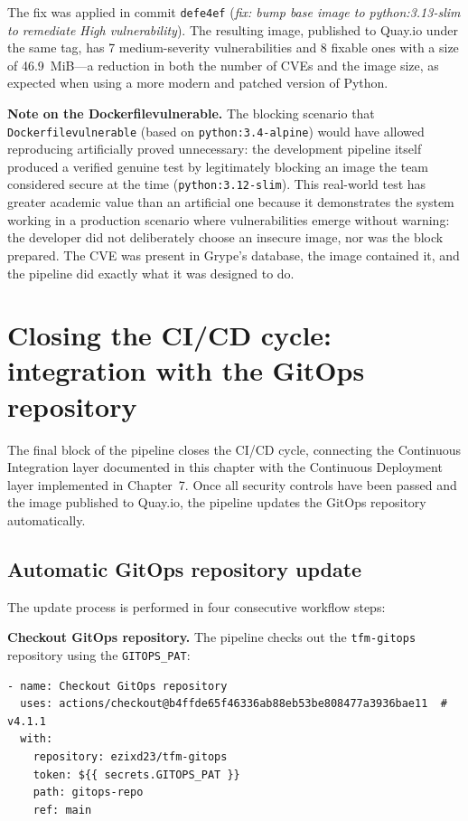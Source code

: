 The fix was applied in commit \texttt{defe4ef} (\textit{fix: bump base image to python:3.13-slim to remediate High vulnerability}). The resulting image, published to Quay.io under the same tag, has 7 medium-severity vulnerabilities and 8 fixable ones with a size of 46.9~MiB---a reduction in both the number of CVEs and the image size, as expected when using a more modern and patched version of Python.

\textbf{Note on the Dockerfilevulnerable.} The blocking scenario that \texttt{Dockerfilevulnerable} (based on \texttt{python:\allowbreak{}3.4-alpine}) would have allowed reproducing artificially proved unnecessary: the development pipeline itself produced a verified genuine test by legitimately blocking an image the team considered secure at the time (\texttt{python:3.12-slim}). This real-world test has greater academic value than an artificial one because it demonstrates the system working in a production scenario where vulnerabilities emerge without warning: the developer did not deliberately choose an insecure image, nor was the block prepared. The CVE was present in Grype's database, the image contained it, and the pipeline did exactly what it was designed to do.

\section{Closing the CI/CD cycle: integration with the GitOps repository}

The final block of the pipeline closes the CI/CD cycle, connecting the Continuous Integration layer documented in this chapter with the Continuous Deployment layer implemented in Chapter~7. Once all security controls have been passed and the image published to Quay.io, the pipeline updates the GitOps repository automatically.

\subsection{Automatic GitOps repository update}

The update process is performed in four consecutive workflow steps:

\textbf{Checkout GitOps repository.} The pipeline checks out the \texttt{tfm-gitops} repository using the \texttt{GITOPS\_PAT}:

\begin{lstlisting}
- name: Checkout GitOps repository
  uses: actions/checkout@b4ffde65f46336ab88eb53be808477a3936bae11  # v4.1.1
  with:
    repository: ezixd23/tfm-gitops
    token: ${{ secrets.GITOPS_PAT }}
    path: gitops-repo
    ref: main
\end{lstlisting}

